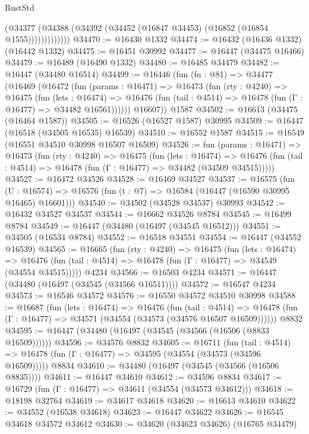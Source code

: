 \begin{lexlean}{RustStd}
\begin{coremodule}
                  (@34377 (@34388 (@34392 (@34452 (@16847 @34453) (@16852 (@16854 @1555)))))))))))))
@34470 := @16430 @1332
@34474 := @16432 (@16436 @1332) (@16442 @1332)
@34475 := @16451 @30992
@34477 := @16447 (@34475 @16466)
@34479 := @16489 (@16490 @1332)
@34480 := @16485 @34479
@34482 := @16447 (@34480 @16514)
@34499 := @16446
    (fun (fn : @81) =>
    @34477
      (@16469
        (@16472
          (fun (params : @16471) =>
          @16473
            (fun (rty : @4240) =>
            @16475
              (fun (lets : @16474) =>
              @16476 (fun (tail : @4514) => @16478 (fun (Γ : @16477) => @34482 @16561))))))
        @16607))
    @1587
@34502 := @16613 (@34475 (@16464 @1587))
@34505 := @16526 (@16527 @1587) @30995
@34509 := @16447 (@16518 (@34505 @16535) @16539)
@34510 := @16552 @1587
@34515 := @16549 (@16551 @34510 @30998 @16507 @16509)
@34526 := fun (params : @16471) =>
  @16473
    (fun (rty : @4240) =>
    @16475
      (fun (lets : @16474) =>
      @16476 (fun (tail : @4514) => @16478 (fun (Γ : @16477) => @34482 (@34509 @34515)))))
@34527 := @16472 @34526
@34528 := @16469 @34527
@34537 := @16575
    (fun (U : @16574) => @16576 (fun (t : @7) => @16584 (@16447 (@16590 @30995 @16465) @16601)))
@34540 := @34502 (@34528 @34537) @30993
@34542 := @16432 @34527 @34537
@34544 := @16662 @34526 @8784
@34545 := @16499 @8784
@34549 := @16447 (@34480 (@16497 (@34545 @16512)))
@34551 := @34505 (@16534 @8784)
@34552 := @16518 @34551
@34554 := @16447 (@34552 @16539)
@34565 := @16665
    (fun (rty : @4240) =>
    @16475
      (fun (lets : @16474) =>
      @16476 (fun (tail : @4514) => @16478 (fun (Γ : @16477) => @34549 (@34554 @34515)))))
    @4234
@34566 := @16503 @4234
@34571 := @16447 (@34480 (@16497 (@34545 (@34566 @16511))))
@34572 := @16547 @4234
@34573 := @16546 @34572
@34576 := @16550 @34572 @34510 @30998
@34588 := @16687
    (fun (lets : @16474) =>
    @16476
      (fun (tail : @4514) =>
      @16478 (fun (Γ : @16477) => @34571 (@34554 (@34573 (@34576 @16507 @16509))))))
    @8832
@34595 := @16447 (@34480 (@16497 (@34545 (@34566 (@16506 (@8833 @16509))))))
@34596 := @34576 @8832
@34605 := @16711
    (fun (tail : @4514) => @16478 (fun (Γ : @16477) => @34595 (@34554 (@34573 (@34596 @16509)))))
    @8834
@34610 := @34480 (@16497 (@34545 (@34566 (@16506 @8835))))
@34611 := @16447 @34610
@34612 := @34596 @8834
@34617 := @16729 (fun (Γ : @16477) => @34611 (@34554 (@34573 @34612)))
@34618 := @18198 @32764
@34619 := @34617 @34618
@34620 := @16613 @34610
@34622 := @34552 (@16538 @34618)
@34623 := @16447 @34622
@34626 := @16545 @34618 @34572 @34612
@34630 := @34620 (@34623 @34626) (@16765 @34479)

\end{coremodule}
\end{lexlean}
